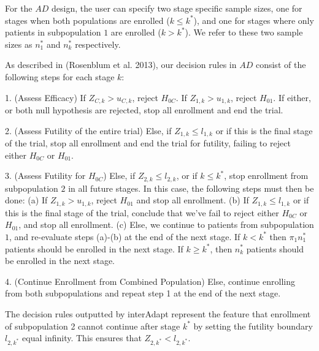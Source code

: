 \documentclass{article}
\newcommand{\interAdapt}{\textsf{interAdapt }}
\begin{document}
For the $AD$ design, the user can specify two stage specific sample sizes, one for stages when both populations are enrolled ($k≤k^*$), and one for stages where only patients in subpopulation $1$ are enrolled ($k>k^*$). We refer to these two sample sizes as $n_1^*$ and $n_k^*$ respectively.

As described in (Rosenblum et al. 2013)\cite{Rosenblum2013AdaptMISTIE}, our decision rules in $AD$ consist of the following steps for each stage $k$:

\begin{description}
\item 1. (Assess Efficacy) If $Z_{C,k} > u_{C,k}$, reject $H_{0C}$. If $Z_{1,k}>u_{1,k}$, reject $H_{01}$. If either, or both null hypothesis are rejected, stop all enrollment and end the trial.
\item 2. (Assess Futility of the entire trial) Else, if $Z_{1,k} ≤ l_{1,k}$ or if this is the final stage of the trial, stop all enrollment and end the trial for futility, failing to reject either $H_{0C}$ or $H_{01}$.
\item 3. (Assess Futility for $H_{0C}$) Else, if $Z_{2,k} ≤ l_{2,k}$, or if $k≤k^*$, stop enrollment from subpopulation $2$ in all future stages. In this case, the following steps must then be done:
	\subitem  (a) If $Z_{1,k} > u_{1,k}$, reject $H_{01}$ and stop all enrollment.
	\subitem  (b) If $Z_{1,k} ≤ l_{1,k}$ or if this is the final stage of the trial, conclude that we've fail to reject either $H_{0C}$ or $H_{01}$, and stop all enrollment.
	\subitem  (c) Else, we continue to patients from subpopulation $1$, and re-evaluate steps (a)-(b) at the end of the next stage. If $k<k^*$ then $π_1n_1^*$ patients should be enrolled in the next stage. If $k≥k^*$, then $n_k^*$ patients should be enrolled in the next stage. 
\item  4. (Continue Enrollment from Combined Population) Else, continue enrolling from both subpopulations and repeat step 1 at the end of the next stage.
\end{description}

The decision rules outputted by \interAdapt represent the feature that enrollment of subpopulation 2 cannot continue after stage $k^*$ by setting the futility boundary $l_{2,k^*}$ equal infinity. This ensures that $Z_{2,k^*}<l_{2,k^*}$. 
\end{document}
